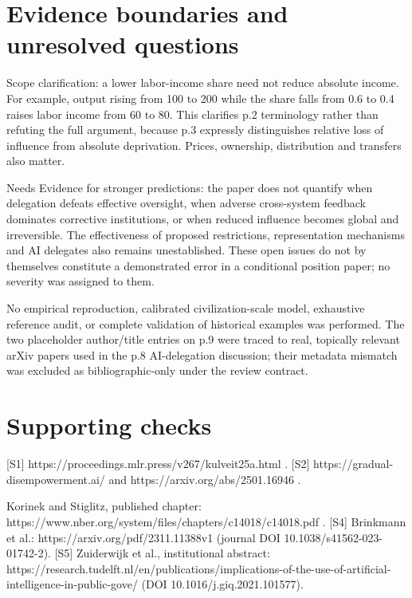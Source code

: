 \documentclass[10pt]{article}
\begin{document}
\section*{Evidence boundaries and unresolved questions}
Scope clarification: a lower labor-income share need not reduce absolute income. For example, output rising from 100 to 200 while the share falls from 0.6 to 0.4 raises labor income from 60 to 80. This clarifies p.2 terminology rather than refuting the full argument, because p.3 expressly distinguishes relative loss of influence from absolute deprivation. Prices, ownership, distribution and transfers also matter.\par
Needs Evidence for stronger predictions: the paper does not quantify when delegation defeats effective oversight, when adverse cross-system feedback dominates corrective institutions, or when reduced influence becomes global and irreversible. The effectiveness of proposed restrictions, representation mechanisms and AI delegates also remains unestablished. These open issues do not by themselves constitute a demonstrated error in a conditional position paper; no severity was assigned to them.\par
No empirical reproduction, calibrated civilization-scale model, exhaustive reference audit, or complete validation of historical examples was performed. The two placeholder author/title entries on p.9 were traced to real, topically relevant arXiv papers used in the p.8 AI-delegation discussion; their metadata mismatch was excluded as bibliographic-only under the review contract.\par
\section*{Supporting checks}
[S1] https://proceedings.mlr.press/v267/kulveit25a.html . [S2] https://gradual-disempowerment.ai/ and https://arxiv.org/abs/2501.16946 .\par
Korinek and Stiglitz, published chapter: https://www.nber.org/system/files/chapters/c14018/c14018.pdf . [S4] Brinkmann et al.: https://arxiv.org/pdf/2311.11388v1 (journal DOI 10.1038/s41562-023-01742-2). [S5] Zuiderwijk et al., institutional abstract: https://research.tudelft.nl/en/publications/implications-of-the-use-of-artificial-intelligence-in-public-gove/ (DOI 10.1016/j.giq.2021.101577).\par
\end{document}
